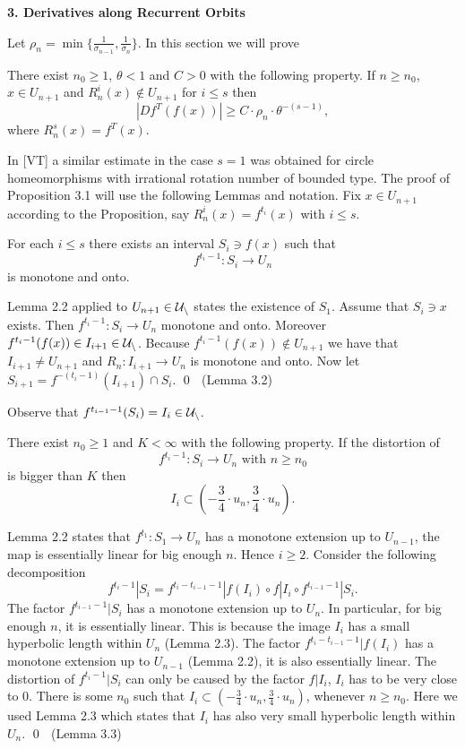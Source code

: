 \bigskip
\centerline{\bf 3. Derivatives along Recurrent  Orbits}
\bigskip

\flushpar
Let $\rho_n=\min\{\frac{1}{\sigma_{n-1}},\frac{1}{\sigma_n}\}$.
In this section we will prove 

 There exist  $n_0\ge 1$, $\theta<1$ and $C>0$ with 
the following property. If $n\ge n_0$, 
$x\in U_{n+1}$ and $R_n^i(x)\notin U_{n+1}$ for $i\le s$
then
$$
|Df^T(f(x))|\ge C\cdot \rho_n \cdot \theta^{-(s-1)},
$$
where $R^s_n(x)=f^T(x)$.
\endproclaim

\flushpar
In [VT] a similar estimate in the case $s=1$ was obtained for circle 
homeomorphisms with irrational rotation number of bounded type.
The proof of Proposition 3.1 will use the following Lemmas 
and notation. Fix
$x\in U_{n+1}$ according to the Proposition, say $R_n^i(x)=f^{t_i}(x)$ with
$i\le s$.

 For each $i\le s$ there exists an interval $S_i\ni f(x)$
such that
$$
f^{t_i-1}:S_i\to U_n
$$ 
is monotone and onto.
\endproclaim

 Lemma 2.2 applied to $U_{n+1}\in \Cal{U}_n$ states the existence 
of $S_1$. Assume that $S_i\ni x$
exists. Then $f^{t_i-1}: S_i\to U_n$ monotone and onto. Moreover 
$f^{t_i-1}(f(x))\in I_{i+1}\in \Cal{U}_n$. Because 
$f^{t_i-1}(f(x))\notin U_{n+1}$ we have that $I_{i+1}\ne U_{n+1}$ and 
$R_n:I_{i+1}\to U_n$ is monotone and onto. Now let 
$S_{i+1}=f^{-(t_i-1)}(I_{i+1})\cap S_i$.
\hfill\hfill\qed $\,\,$ (Lemma 3.2)
\enddemo

\flushpar
Observe that $f^{t_{i-1}-1}(S_i)=I_i\in \Cal{U}_n$.

 There exist $n_0\ge 1$ and $K<\infty$ with the 
following property. If the distortion of
$$
f^{t_i-1}:S_i\to U_n \text{ with } n\ge n_0
$$ 
is bigger than $K$ then
$$
I_i\subset (-\frac34 \cdot u_n, \frac34 \cdot u_n).
$$
\endproclaim

 Lemma 2.2 states that $f^{t_1}:S_1\to U_n$ has a monotone 
extension up to $U_{n-1}$, the map is essentially linear for big enough $n$. 
Hence $i\ge 2$.
Consider the following decomposition
$$
f^{t_i-1}|S_i=f^{t_{i}-t_{i-1}-1}|f(I_i)\circ 
              f|I_i\circ
              f^{t_{i-1}-1}|S_i.
$$ 
The factor $f^{t_{i-1}-1}|S_i$ has a monotone extension up to 
$U_n$. In particular, for big enough $n$, it
is essentially linear. This is because the image $I_i$
has a small hyperbolic length within $U_n$ (Lemma 2.3). The factor
$f^{t_{i}-t_{i-1}-1}|f(I_i)$
has a monotone extension up to $U_{n-1}$ (Lemma 2.2), it is also essentially
linear. The distortion of $f^{t_i-1}|S_i$ can only be caused by the factor
$f|I_i$, $I_i$ has to be very close to $0$. There is some $n_0$
such that $I_i\subset (-\frac34 \cdot u_n, \frac34\cdot u_n)$, 
whenever $n\ge n_0$.
Here we used Lemma 2.3 which states that $I_i$ has also very small hyperbolic 
length within $U_n$.
\hfill\hfill\qed $\,\,$ (Lemma 3.3)
\enddemo

